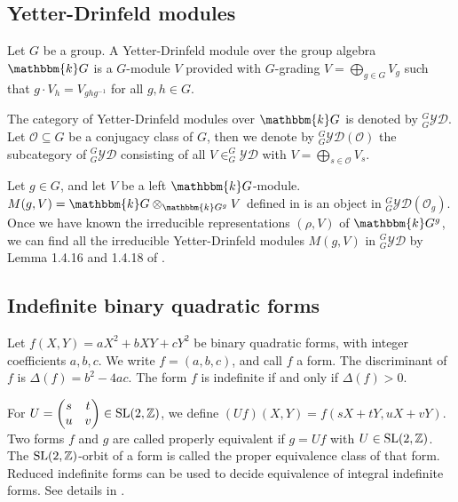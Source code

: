 \documentclass{amsproc}
\theoremstyle{definition}
\theoremstyle{remark}
\numberwithin{equation}{section}
\begin{document}
\subsection{Yetter-Drinfeld modules}

Let $G$ be a group. A  Yetter-Drinfeld module over the group algebra $\mathbbm{k}G$ is a 
$G$-module $V$ provided with $G$-grading $V=\bigoplus_{g\in G} V_g$ such that
$g\cdot V_h=V_{ghg^{-1}}$ for all $g,h\in G$.




The category of Yetter-Drinfeld modules over $\mathbbm{k}G$ is denoted by $^G_G\mathcal{YD}$.
Let $\mathcal{O} \subseteq G$ be a conjugacy class of $G$, then we denote by $^G_G\mathcal{YD}(\mathcal{O})$
the subcategory of $^G_G\mathcal{YD}$ consisting of all $V\in ^G_G\mathcal{YD}$ with
$V=\bigoplus_{s\in \mathcal{O}} V_s$.

Let $g\in G$, and let $V$ be a left $\mathbbm{k}G$-module. 
$M{(g,V)}=\mathbbm{k}G\otimes_{\mathbbm{k}G^g}V$ defined in \cite [Definition 1.4.15]{HS}
is an object in $^G_G\mathcal{YD}(\mathcal{O}_g)$.
Once we have known the  irreducible representations $(\rho, V)$ of $\mathbbm{k}G^g$,
 we can find all the irreducible Yetter-Drinfeld modules $M{(g,V)}$ in $^G_G\mathcal{YD}$ 
 by Lemma 1.4.16 and 1.4.18 of \cite{HS}.

 


 
 

 



\subsection{Indefinite binary quadratic forms}
Let $f(X,Y)=aX^2+bXY+cY^2$ be binary quadratic forms, with integer coefficients $a, b, c$.
 We write $f=(a,b,c)$, and call $f$ a form.
The discriminant of $f$ is $\Delta(f)=b^2-4ac$.
The form $f$ is indefinite if and only if $\Delta(f)>0$.




For $U=\left(\begin{matrix}
s & t  \\
u & v  
\end{matrix}\right)\in \rm{SL(2,\mathbb{Z})}$,
we define $(Uf)(X,Y)=f(sX + tY,uX + vY)$.
Two forms $f$ and $g$ are called properly equivalent if $g =Uf$ with $U\in \rm{SL(2,\mathbb{Z})}$.
 The $\rm{SL(2,\mathbb{Z})}$-orbit of a form is called the proper equivalence class
of that form. Reduced indefinite forms can be used to decide equivalence of integral indefinite forms.
See details in \cite{BV}.
\end{document}
